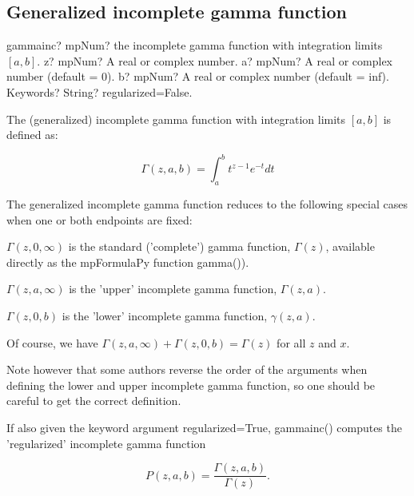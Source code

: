 

\subsection{Generalized incomplete gamma function}

\begin{mpFunctionsExtract}
	\mpFunctionFour
	{gammainc? mpNum? the incomplete gamma function with integration limits $[a, b]$.}
	{z? mpNum? A real or complex number.}
	{a? mpNum? A real or complex number (default = 0).}
	{b? mpNum? A real or complex number (default = inf).}	
	{Keywords? String?  regularized=False.}	
\end{mpFunctionsExtract}

\vpara
The (generalized) incomplete gamma function with integration limits $[a, b]$ is defined as:

\begin{equation}
\Gamma(z, a, b) = \int_a^b t^{z-1} e^{-t} dt
\end{equation}

The generalized incomplete gamma function reduces to the following special cases when one or both endpoints are fixed:

\vpara
$\Gamma(z, 0, \infty)$ is the standard ('complete') gamma function, $\Gamma(z)$,  available directly as the mpFormulaPy function gamma()).

$\Gamma(z, a, \infty)$ is the 'upper' incomplete gamma function, $\Gamma(z, a)$.

$\Gamma(z, 0, b)$ is the 'lower' incomplete gamma function, $\gamma(z, a)$.

\vpara
Of course, we have $\Gamma(z, a, \infty) + \Gamma(z, 0, b) = \Gamma(z)$ for all $z$ and $x$.

\vpara
Note however that some authors reverse the order of the arguments when defining the lower and upper incomplete gamma function, so one should be careful to get the correct definition.

\vpara
If also given the keyword argument regularized=True, gammainc() computes the 'regularized' incomplete gamma function

\begin{equation}
P(z, a, b) = \frac{\Gamma(z, a, b)}{\Gamma(z)}.
\end{equation}

